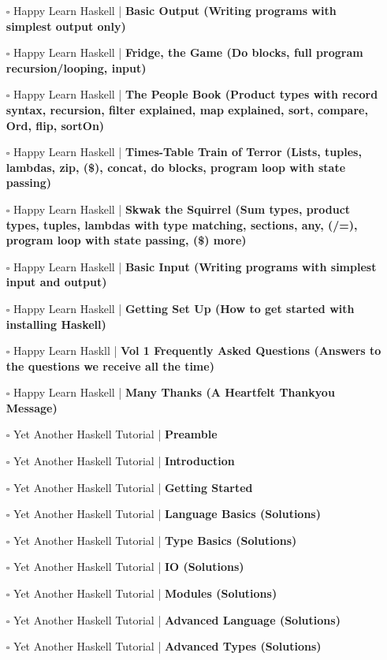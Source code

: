 \documentclass[a4, landscape, 12pt]{article}
\newcommand{\checkbox}{$\square$}%
\begin{document}
\begin{itemize}
\item [\checkbox]  Happy Learn Haskell | \textbf{ Basic Output (Writing programs with simplest output only)
}
\item [\checkbox]  Happy Learn Haskell | \textbf{ Fridge, the Game (Do blocks, full program recursion/looping, input)
}
\item [\checkbox]  Happy Learn Haskell | \textbf{ The People Book (Product types with record syntax, recursion, filter explained, map explained, sort, compare, Ord, flip, sortOn)
}
\item [\checkbox]  Happy Learn Haskell | \textbf{ Times-Table Train of Terror (Lists, tuples, lambdas, zip, (\$), concat, do blocks, program loop with state passing)
}
\item [\checkbox]  Happy Learn Haskell | \textbf{ Skwak the Squirrel (Sum types, product types, tuples, lambdas with type matching, sections, any, (/=), program loop with state passing, (\$) more)
}
\item [\checkbox]  Happy Learn Haskell | \textbf{ Basic Input (Writing programs with simplest input and output)
}
\item [\checkbox]  Happy Learn Haskell | \textbf{ Getting Set Up (How to get started with installing Haskell)
}
\item [\checkbox]  Happy Learn Haskll | \textbf{ Vol 1 Frequently Asked Questions (Answers to the questions we receive all the time)
}
\item [\checkbox]  Happy Learn Haskell | \textbf{ Many Thanks (A Heartfelt Thankyou Message)
}
\item [\checkbox]  Yet Another Haskell Tutorial | \textbf{ Preamble
}
\item [\checkbox]  Yet Another Haskell Tutorial | \textbf{ Introduction
}
\item [\checkbox]  Yet Another Haskell Tutorial | \textbf{ Getting Started
}
\item [\checkbox]  Yet Another Haskell Tutorial | \textbf{ Language Basics (Solutions)
}
\item [\checkbox]  Yet Another Haskell Tutorial | \textbf{ Type Basics (Solutions)
}
\item [\checkbox]  Yet Another Haskell Tutorial | \textbf{ IO (Solutions)
}
\item [\checkbox]  Yet Another Haskell Tutorial | \textbf{ Modules (Solutions)
}
\item [\checkbox]  Yet Another Haskell Tutorial | \textbf{ Advanced Language (Solutions)
}
\item [\checkbox]  Yet Another Haskell Tutorial | \textbf{ Advanced Types (Solutions)
}
\end{itemize}
\end{document}
